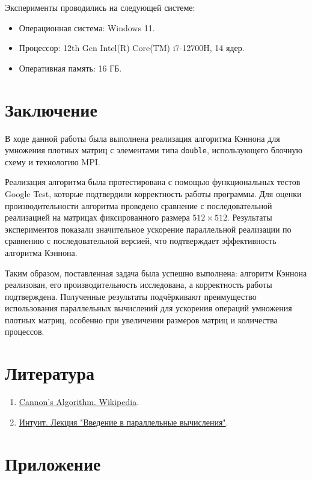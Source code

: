 \documentclass[12pt]{article}
\begin{document}
Эксперименты проводились на следующей системе:
\begin{itemize}
    \item Операционная система: Windows 11.
    \item Процессор: 12th Gen Intel(R) Core(TM) i7-12700H, 14 ядер.
    \item Оперативная память: 16 ГБ.
\end{itemize}


\section{Заключение}

\hspace*{1.25em}В ходе данной работы была выполнена реализация алгоритма Кэннона для умножения плотных матриц с элементами типа \texttt{double}, использующего блочную схему и технологию MPI. 

Реализация алгоритма была протестирована с помощью функциональных тестов Google Test, которые подтвердили корректность работы программы. Для оценки производительности алгоритма проведено сравнение с последовательной реализацией на матрицах фиксированного размера $512 \times 512$. Результаты экспериментов показали значительное ускорение параллельной реализации по сравнению с последовательной версией, что подтверждает эффективность алгоритма Кэннона.

Таким образом, поставленная задача была успешно выполнена: алгоритм Кэннона реализован, его производительность исследована, а корректность работы подтверждена. Полученные результаты подчёркивают преимущество использования параллельных вычислений для ускорения операций умножения плотных матриц, особенно при увеличении размеров матриц и количества процессов.


\section*{Литература}

\begin{enumerate}
    \item \href{https://en.wikipedia.org/wiki/Cannon%27s_algorithm}{Cannon's Algorithm. Wikipedia}.
    \item \href{https://intuit.ru/studies/courses/1156/190/lecture/4954?page=5}{Интуит. Лекция "Введение в параллельные вычисления"}.
\end{enumerate}

\appendix
\section*{Приложение}
\end{document}
